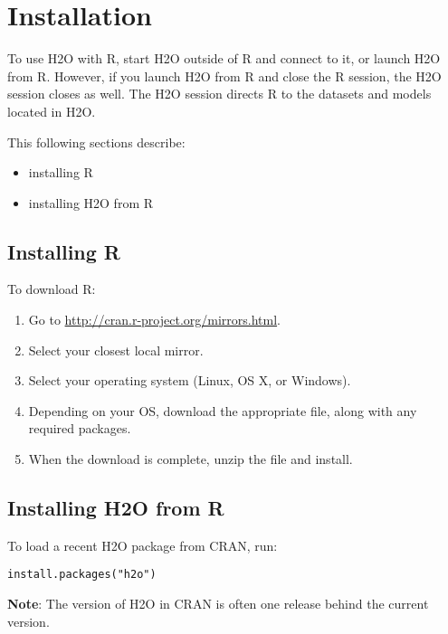 {\begin{enumerate}
\end{enumerate}




\section{Installation}

To use H2O with R, start H2O outside of R and connect to it, or launch H2O from R. However, if you launch H2O from R and close the R session, the H2O session closes as well. The H2O session directs R to the datasets and models located in H2O.

This following sections describe: 

\begin{itemize}
\item installing R 
\item installing H2O from R
\end{itemize}

\subsection{Installing R}

To download R:
\begin{enumerate}
\item Go to \url{http://cran.r-project.org/mirrors.html}. 
\item Select your closest local mirror. 
\item Select your operating system (Linux, OS X, or Windows). 
\item Depending on your OS, download the appropriate file, along with any required packages. 
\item When the download is complete, unzip the file and install. \\
\end{enumerate}

\subsection{Installing H2O from R}

To load a recent H2O package from CRAN, run:

\begin{lstlisting}[style=R]
install.packages("h2o")
\end{lstlisting}

{\bf{Note}}: The version of H2O in CRAN is often one release behind the current version.

}
